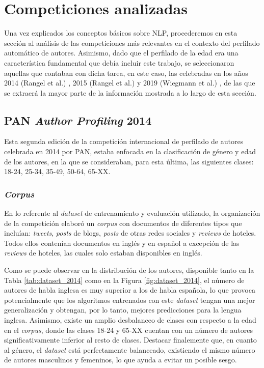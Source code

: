 \section{Competiciones analizadas}
\label{sec:competiciones_analizados}

Una vez explicados los conceptos básicos sobre NLP, procederemos en esta sección al análisis de las competiciones más relevantes en el contexto
del perfilado automático de autores.
Asimismo, dado que el perfilado de la edad era una característica fundamental que debía incluir este trabajo, se seleccionaron aquellas
que contaban con dicha tarea, en este caso, las celebradas en los años 2014 (Rangel et al.) \cite{rangel2014overview}, 2015 (Rangel et al.) \cite{rangel2015overview} y 2019 (Wiegmann et al.) \cite{wiegmann2019overview},
de las que se extraerá la mayor parte de la información mostrada a lo largo de esta sección.

\subsection{PAN \textit{Author Profiling} 2014}

Esta segunda edición de la competición internacional de perfilado de autores celebrada en 2014 por PAN, estaba enfocada en la clasificación de género y edad de los autores, en la que se consideraban, para esta última, las siguientes
clases: 18-24, 25-34, 35-49, 50-64, 65-XX.

\subsubsection{\textit{Corpus}}

En lo referente al \textit{dataset} de entrenamiento y evaluación utilizado, la organización de la
competición elaboró un \textit{corpus} con documentos de diferentes tipos que incluían: \textit{tweets}, \textit{posts} de blogs, \textit{posts} de otras redes sociales y \textit{reviews} de hoteles.
Todos ellos contenían documentos en inglés y en español a excepción de las \textit{reviews} de hoteles, las cuales solo estaban disponibles en inglés.

\bigskip
Como se puede observar en la distribución de los autores, disponible tanto en la Tabla \ref{tab:dataset_2014} como en la Figura \ref{fig:dataset_2014}, el número de autores de habla inglesa
es muy superior a los de habla española, lo que provoca potencialmente que los algoritmos entrenados con este \textit{dataset} tengan una mejor generalización y obtengan, por lo tanto,
mejores predicciones para la lengua inglesa. Asimismo, existe un amplio desbalanceo de clases con respecto a la edad en el \textit{corpus},
donde las clases 18-24 y 65-XX cuentan con un número de autores significativamente inferior al resto de clases. Destacar finalemente que,
en cuanto al género, el \textit{dataset} está perfectamente balanceado, existiendo el mismo número de autores masculinos y femeninos, lo que
ayuda a evitar un posible sesgo.

